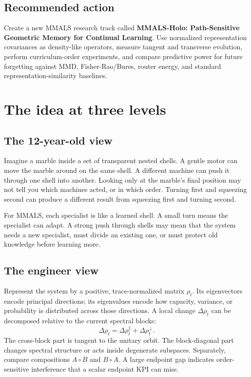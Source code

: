 \subsection{Recommended action}

\begin{researchbox}
Create a new MMALS research track called \textbf{MMALS-Holo: Path-Sensitive Geometric Memory for Continual Learning}. Use normalized representation covariances as density-like operators, measure tangent and transverse evolution, perform curriculum-order experiments, and compare predictive power for future forgetting against MMD, Fisher-Rao/Bures, router energy, and standard representation-similarity baselines.
\end{researchbox}

\section{The idea at three levels}

\subsection{The 12-year-old view}

\begin{kidbox}
Imagine a marble inside a set of transparent nested shells. A gentle motor can move the marble around on the same shell. A different machine can push it through one shell into another. Looking only at the marble's final position may not tell you which machines acted, or in which order. Turning first and squeezing second can produce a different result from squeezing first and turning second.

For MMALS, each specialist is like a learned shell. A small turn means the specialist can adapt. A strong push through shells may mean that the system needs a new specialist, must divide an existing one, or must protect old knowledge before learning more.
\end{kidbox}

\subsection{The engineer view}

\begin{engineerbox}
Represent the system by a positive, trace-normalized matrix $\rho_t$. Its eigenvectors encode principal directions; its eigenvalues encode how capacity, variance, or probability is distributed across those directions. A local change $\Delta\rho_t$ can be decomposed relative to the current spectral blocks:
\[
\Delta\rho_t = \Delta\rho_t^{\parallel} + \Delta\rho_t^{\perp}.
\]
The cross-block part is tangent to the unitary orbit. The block-diagonal part changes spectral structure or acts inside degenerate subspaces. Separately, compare compositions $A\circ B$ and $B\circ A$. A large endpoint gap indicates order-sensitive interference that a scalar endpoint KPI can miss.
\end{engineerbox}

